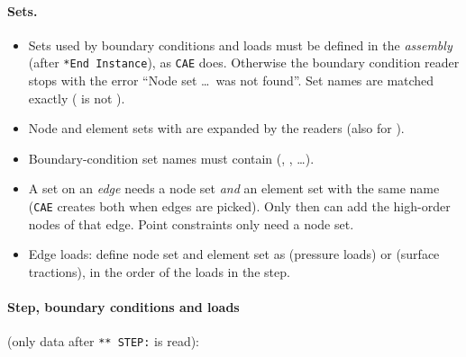 \paragraph{Sets.}
\begin{itemize}
  \item Sets used by boundary conditions and loads must be defined in the
    \emph{assembly} (after \texttt{*End Instance}), as \texttt{CAE} does. Otherwise the
    boundary condition reader stops with the error ``Node set \dots\ was not
    found''. Set names are matched exactly ( is not ).
  \item Node and element sets with  are expanded by the readers
    (also for ).
  \item Boundary-condition set names must contain  (,
    , \dots).
  \item A set on an \emph{edge} needs a node set \emph{and} an element set with the
    same name (\texttt{CAE} creates both when edges are picked). Only then can
     add the high-order nodes of that edge. Point
    constraints only need a node set.
  \item Edge loads: define node set and element set as  (pressure
    loads) or  (surface tractions), in the order of the loads in
    the step.
\end{itemize}

\paragraph{Step, boundary conditions and loads} (only data after
\texttt{** STEP:} is read):

